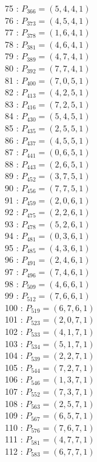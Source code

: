 \documentclass{article}
\begin{document}
{\begin{multicols}{3}
75 : $P_{366}=( 5, 4, 4, 1 )$\\
76 : $P_{373}=( 4, 5, 4, 1 )$\\
77 : $P_{378}=( 1, 6, 4, 1 )$\\
78 : $P_{381}=( 4, 6, 4, 1 )$\\
79 : $P_{389}=( 4, 7, 4, 1 )$\\
80 : $P_{392}=( 7, 7, 4, 1 )$\\
81 : $P_{400}=( 7, 0, 5, 1 )$\\
82 : $P_{413}=( 4, 2, 5, 1 )$\\
83 : $P_{416}=( 7, 2, 5, 1 )$\\
84 : $P_{430}=( 5, 4, 5, 1 )$\\
85 : $P_{435}=( 2, 5, 5, 1 )$\\
86 : $P_{437}=( 4, 5, 5, 1 )$\\
87 : $P_{441}=( 0, 6, 5, 1 )$\\
88 : $P_{443}=( 2, 6, 5, 1 )$\\
89 : $P_{452}=( 3, 7, 5, 1 )$\\
90 : $P_{456}=( 7, 7, 5, 1 )$\\
91 : $P_{459}=( 2, 0, 6, 1 )$\\
92 : $P_{475}=( 2, 2, 6, 1 )$\\
93 : $P_{478}=( 5, 2, 6, 1 )$\\
94 : $P_{481}=( 0, 3, 6, 1 )$\\
95 : $P_{485}=( 4, 3, 6, 1 )$\\
96 : $P_{491}=( 2, 4, 6, 1 )$\\
97 : $P_{496}=( 7, 4, 6, 1 )$\\
98 : $P_{509}=( 4, 6, 6, 1 )$\\
99 : $P_{512}=( 7, 6, 6, 1 )$\\
100 : $P_{519}=( 6, 7, 6, 1 )$\\
101 : $P_{523}=( 2, 0, 7, 1 )$\\
102 : $P_{533}=( 4, 1, 7, 1 )$\\
103 : $P_{534}=( 5, 1, 7, 1 )$\\
104 : $P_{539}=( 2, 2, 7, 1 )$\\
105 : $P_{544}=( 7, 2, 7, 1 )$\\
106 : $P_{546}=( 1, 3, 7, 1 )$\\
107 : $P_{552}=( 7, 3, 7, 1 )$\\
108 : $P_{563}=( 2, 5, 7, 1 )$\\
109 : $P_{567}=( 6, 5, 7, 1 )$\\
110 : $P_{576}=( 7, 6, 7, 1 )$\\
111 : $P_{581}=( 4, 7, 7, 1 )$\\
112 : $P_{583}=( 6, 7, 7, 1 )$\\
\end{multicols}


}
\end{document}
